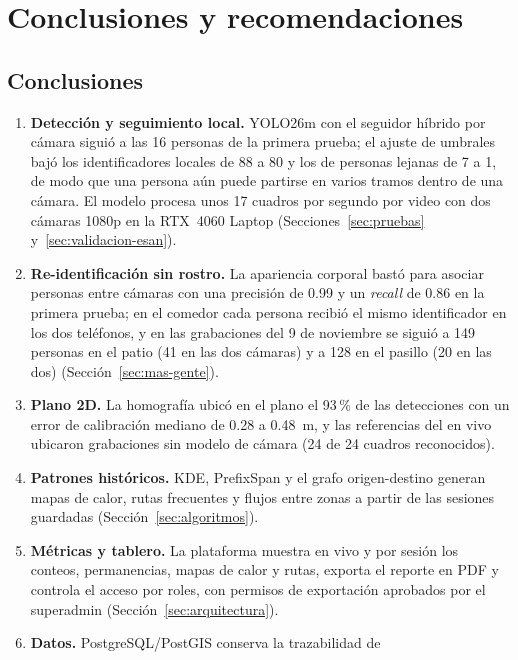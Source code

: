 \section{Conclusiones y recomendaciones}
\label{sec:conclusiones}

\subsection{Conclusiones}

\begin{enumerate}
    \item \textbf{Detección y seguimiento local.} YOLO26m con el seguidor
    híbrido por cámara siguió a las 16 personas de la primera prueba; el
    ajuste de umbrales bajó los identificadores locales de 88 a 80 y los
    de personas lejanas de 7 a 1, de modo que una persona aún puede
    partirse en varios tramos dentro de una cámara. El modelo procesa unos
    17 cuadros por segundo por video con dos cámaras 1080p en la RTX~4060
    Laptop (Secciones~\ref{sec:pruebas} y~\ref{sec:validacion-esan}).
    \item \textbf{Re-identificación sin rostro.} La apariencia corporal
    bastó para asociar personas entre cámaras con una precisión de 0.99 y
    un \textit{recall} de 0.86 en la primera prueba; en el comedor cada
    persona recibió el mismo identificador en los dos teléfonos, y en las
    grabaciones del 9 de noviembre se siguió a 149 personas en el patio
    (41 en las dos cámaras) y a 128 en el pasillo (20 en las dos)
    (Sección~\ref{sec:mas-gente}).
    \item \textbf{Plano 2D.} La homografía ubicó en el plano el 93\,\% de
    las detecciones con un error de calibración mediano de 0.28 a 0.48~m,
    y las referencias del en vivo ubicaron grabaciones sin modelo de
    cámara (24 de 24 cuadros reconocidos).
    \item \textbf{Patrones históricos.} KDE, PrefixSpan y el grafo
    origen-destino generan mapas de calor, rutas frecuentes y flujos entre
    zonas a partir de las sesiones guardadas (Sección~\ref{sec:algoritmos}).
    \item \textbf{Métricas y tablero.} La plataforma muestra en vivo y por
    sesión los conteos, permanencias, mapas de calor y rutas, exporta el
    reporte en PDF y controla el acceso por roles, con permisos de
    exportación aprobados por el superadmin (Sección~\ref{sec:arquitectura}).
    \item \textbf{Datos.} PostgreSQL/PostGIS conserva la trazabilidad de

\end{enumerate}
